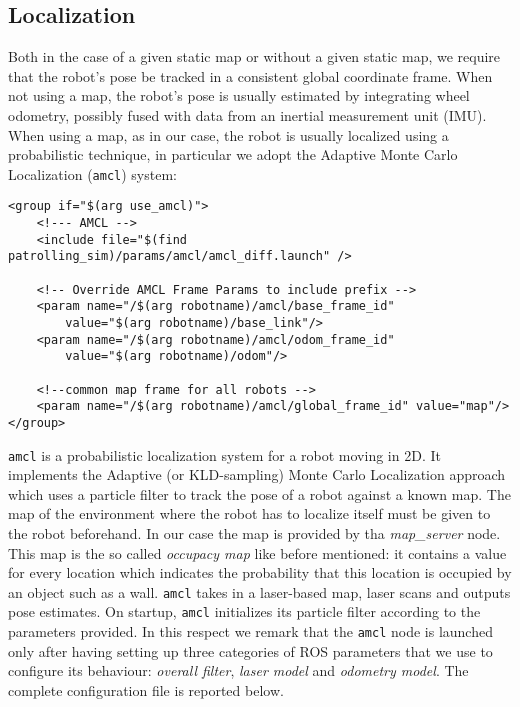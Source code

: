 \subsection{Localization}
Both in the case of a given static map or without a given static map, we
require that the robot’s pose be tracked in a consistent global coordinate frame.
When not using a map, the robot’s pose is usually estimated by integrating
wheel odometry, possibly fused with data from an inertial measurement unit
(IMU). When using a map, as in our case, the robot is usually localized using
a probabilistic technique, in particular we adopt the Adaptive Monte Carlo
Localization (\texttt{amcl}) system:
\begin{lstlisting}
<group if="$(arg use_amcl)">
    <!--- AMCL -->
    <include file="$(find patrolling_sim)/params/amcl/amcl_diff.launch" />       

    <!-- Override AMCL Frame Params to include prefix -->
    <param name="/$(arg robotname)/amcl/base_frame_id" 
        value="$(arg robotname)/base_link"/>
    <param name="/$(arg robotname)/amcl/odom_frame_id" 
        value="$(arg robotname)/odom"/>
    
    <!--common map frame for all robots -->
    <param name="/$(arg robotname)/amcl/global_frame_id" value="map"/> 
</group>
\end{lstlisting}
\texttt{amcl} is a probabilistic localization system for a robot moving in 2D.
It implements the Adaptive (or KLD-sampling) Monte Carlo Localization
approach which uses a particle filter to track the pose of a robot against
a known map. The map of the environment where the robot has to localize
itself must be given to the robot beforehand. In our case the map is provided
by tha \textit{map\_server} node. This map is the so called \textit{occupacy map}
like before mentioned: it contains a value for every location which indicates the 
probability that this location is occupied by an object such as a wall. 
\texttt{amcl} takes in a laser-based map, laser scans and outputs pose estimates.
On startup, \texttt{amcl} initializes its particle filter according to the parameters
provided. In this respect we remark that the \texttt{amcl} node is launched only 
after having setting up three categories of ROS parameters that we use to configure 
its behaviour: \textit{overall filter}, \textit{laser model} and \textit{odometry model}.
The complete configuration file is reported below.
